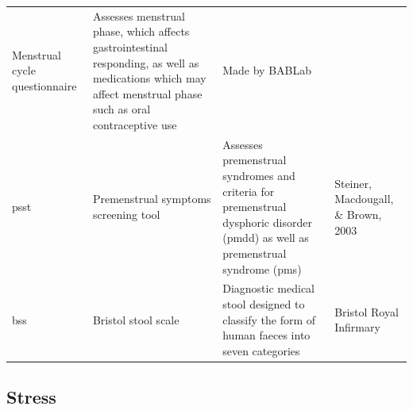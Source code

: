\documentclass[]{book}
\begin{document}
\begin{longtable}[]{@{}llll@{}}
\begin{minipage}[t]{0.27\columnwidth}
Menstrual cycle questionnaire\strut
\end{minipage} & \begin{minipage}[t]{0.22\columnwidth}\raggedright
Assesses menstrual phase, which affects gastrointestinal responding, as well as medications which may affect menstrual phase such as oral contraceptive use\strut
\end{minipage} & \begin{minipage}[t]{0.18\columnwidth}\raggedright
Made by BABLab\strut
\end{minipage}\tabularnewline
\begin{minipage}[t]{0.22\columnwidth}\raggedright
psst\strut
\end{minipage} & \begin{minipage}[t]{0.27\columnwidth}\raggedright
Premenstrual symptoms screening tool\strut
\end{minipage} & \begin{minipage}[t]{0.22\columnwidth}\raggedright
Assesses premenstrual syndromes and criteria for premenstrual dysphoric disorder (pmdd) as well as premenstrual syndrome (pms)\strut
\end{minipage} & \begin{minipage}[t]{0.18\columnwidth}\raggedright
Steiner, Macdougall, \& Brown, 2003\strut
\end{minipage}\tabularnewline
\begin{minipage}[t]{0.22\columnwidth}\raggedright
bss\strut
\end{minipage} & \begin{minipage}[t]{0.27\columnwidth}\raggedright
Bristol stool scale\strut
\end{minipage} & \begin{minipage}[t]{0.22\columnwidth}\raggedright
Diagnostic medical stool designed to classify the form of human faeces into seven categories\strut
\end{minipage} & \begin{minipage}[t]{0.18\columnwidth}\raggedright
Bristol Royal Infirmary\strut
\end{minipage}\tabularnewline
\bottomrule
\end{longtable}

\hypertarget{stress}{%
\subsection{Stress}\label{stress}}
\end{document}

